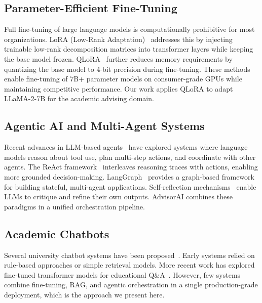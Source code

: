 \documentclass[conference,compsoc]{IEEEtran}
\begin{document}
\subsection{Parameter-Efficient Fine-Tuning}

Full fine-tuning of large language models is computationally prohibitive for most organizations. LoRA (Low-Rank Adaptation)~\cite{hu2022lora} addresses this by injecting trainable low-rank decomposition matrices into transformer layers while keeping the base model frozen. QLoRA~\cite{dettmers2023qlora} further reduces memory requirements by quantizing the base model to 4-bit precision during fine-tuning. These methods enable fine-tuning of 7B+ parameter models on consumer-grade GPUs while maintaining competitive performance. Our work applies QLoRA to adapt LLaMA-2-7B for the academic advising domain.

\subsection{Agentic AI and Multi-Agent Systems}

Recent advances in LLM-based agents~\cite{yao2022webshop} have explored systems where language models reason about tool use, plan multi-step actions, and coordinate with other agents. The ReAct framework~\cite{yao2023react} interleaves reasoning traces with actions, enabling more grounded decision-making. LangGraph~\cite{langgraph2024} provides a graph-based framework for building stateful, multi-agent applications. Self-reflection mechanisms~\cite{shinn2023reflexion} enable LLMs to critique and refine their own outputs. AdvisorAI combines these paradigms in a unified orchestration pipeline.

\subsection{Academic Chatbots}

Several university chatbot systems have been proposed~\cite{holotescu2016moocbuddy, hasan2019chatbot, ranoliya2017chatbot}. Early systems relied on rule-based approaches or simple retrieval models. More recent work has explored fine-tuned transformer models for educational Q\&A~\cite{biswas2020university}. However, few systems combine fine-tuning, RAG, and agentic orchestration in a single production-grade deployment, which is the approach we present here.

\end{document}

